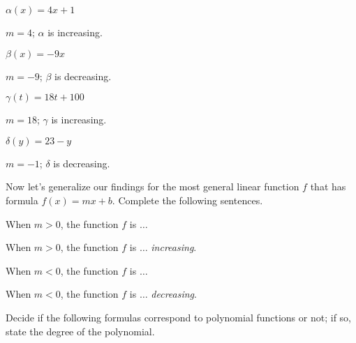 \begin{exercises}
\begin{problem}
\begin{multicols}{4}
	\begin{subproblem}
		$\alpha(x)=4x+1$ 
		\begin{shortsolution}
			$m=4$; $\alpha$ is increasing. 
		\end{shortsolution}
	\end{subproblem}
	\begin{subproblem}
		$\beta(x)=-9x$ 
		\begin{shortsolution}
			$m=-9$; $\beta$ is decreasing. 
		\end{shortsolution}
	\end{subproblem}
	\begin{subproblem}
		$\gamma(t)=18t+100$ 
		\begin{shortsolution}
			$m=18$; $\gamma$ is increasing.
		\end{shortsolution}
	\end{subproblem}
	\begin{subproblem}
		$\delta(y)=23-y$ 
		\begin{shortsolution}
			$m=-1$; $\delta$ is decreasing. 
		\end{shortsolution}
	\end{subproblem}
\end{multicols}
Now let's generalize our findings for the most general linear function $f$
that has formula $f(x)=mx+b$. Complete the following sentences.
\begin{subproblem}
	When $m>0$, the function $f$ is $\ldots$  
	\begin{shortsolution}
		When $m>0$, the function $f$ is $\ldots$  \emph{increasing}.
	\end{shortsolution}
\end{subproblem}
\begin{subproblem}
	When $m<0$, the function $f$ is $\ldots$  
	\begin{shortsolution}
		When $m<0$, the function $f$ is $\ldots$  \emph{decreasing}.
	\end{shortsolution}
\end{subproblem}
\end{problem}
\begin{problem}
Decide if the following formulas correspond to polynomial functions 
or not; if so, state the degree of the polynomial.
\begin{multicols}{3}
	\begin{subproblem}

\end{subproblem}
\end{multicols}
\end{problem}
\end{exercises}
